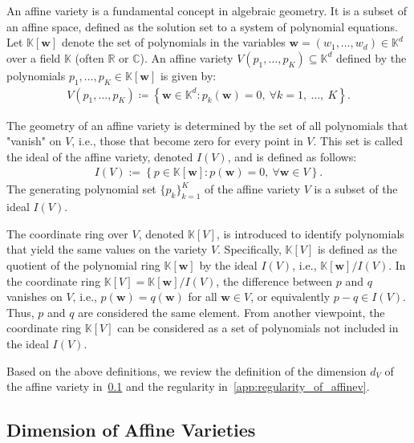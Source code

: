 \documentclass{article}
\theoremstyle{plain}
\theoremstyle{definition}
\theoremstyle{remark}
\begin{document}
An affine variety is a fundamental concept in algebraic geometry. It is a subset of an affine space, defined as the solution set to a system of polynomial equations. Let \( \mathbb{K}[\bm{w}] \) denote the set of polynomials in the variables \(\bm{w} = (w_1, \ldots, w_d) \in \mathbb{K}^d\) over a field \(\mathbb{K}\) (often \(\mathbb{R}\) or \(\mathbb{C}\)). An affine variety \( V(p_1, \ldots, p_K) \subseteq \mathbb{K}^d\) defined by the polynomials \(p_1, \ldots, p_K \in \mathbb{K}[\bm{w}]\) is given by:
\begin{gather*}
V(p_1, \ldots, p_K) \coloneqq \left\{ \bm{w} \in \mathbb{K}^d : p_k(\bm{w}) = 0,\ \forall k = 1,\ \ldots,\ K \right\}.
\end{gather*}

The geometry of an affine variety is determined by the set of all polynomials that "vanish" on \(V\), i.e., those that become zero for every point in \(V\). This set is called the ideal of the affine variety, denoted \(I(V)\), and is defined as follows:
\begin{gather*}
I(V) := \left\{ p \in \mathbb{K}[\bm{w}] : p(\bm{w}) = 0,\ \forall \bm{w} \in V \right\}.
\end{gather*}
The generating polynomial set \(\{ p_k \}_{k=1}^K\) of the affine variety \(V\) is a subset of the ideal \(I(V)\).

The coordinate ring over \(V\), denoted \(\mathbb{K}[V]\), is introduced to identify polynomials that yield the same values on the variety \(V\). Specifically, \(\mathbb{K}[V]\) is defined as the quotient of the polynomial ring \(\mathbb{K}[\bm{w}]\) by the ideal \(I(V)\), i.e., \(\mathbb{K}[\bm{w}] / I(V)\).
In the coordinate ring \(\mathbb{K}[V] = \mathbb{K}[\bm{w}] / I(V)\), the difference between \(p\) and \(q\) vanishes on \(V\), i.e., \(p(\bm{w}) = q(\bm{w})\) for all \(\bm{w} \in V\), or equivalently \(p - q \in I(V)\). Thus, \(p\) and \(q\) are considered the same element. From another viewpoint, the coordinate ring \(\mathbb{K}[V]\) can be considered as a set of polynomials not included in the ideal \(I(V)\).

Based on the above definitions, we review the definition of the dimension \(d_{V}\) of the affine variety in~\cref{app:dimension_of_affinev} and the regularity in~\cref{app:regularity_of_affinev}.

\subsection{Dimension of Affine Varieties}
\label{app:dimension_of_affinev}
\end{document}
